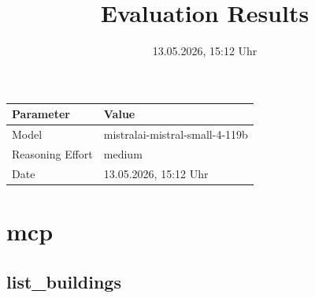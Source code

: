 \documentclass[a4paper,11pt]{article}
\title{Evaluation Results}
\date{13.05.2026, 15:12 Uhr}
\begin{document}
\maketitle

\begin{table}[H]
\centering
\begin{tabular}{l l}
\toprule
\textbf{Parameter} & \textbf{Value} \\
\midrule
Model & mistralai-mistral-small-4-119b \\
Reasoning Effort & medium \\
Date & 13.05.2026, 15:12 Uhr \\
\bottomrule
\end{tabular}
\end{table}

\tableofcontents
\clearpage

\section{mcp}

\subsection{list\_buildings}
\end{document}
